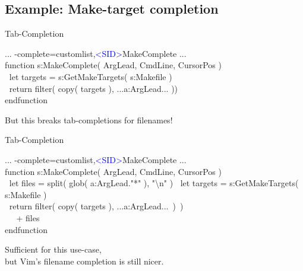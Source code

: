 \documentclass{beamer}
\newenvironment{mycode}[0]
{\ttfamily}
{}
\newcommand{\myind}[1]{\textcolor{white}{#1}}
\newcommand{\myident}[1]{\textcolor{identifier}{#1}}
\newcommand{\mykeywd}[1]{\textcolor{keyword}{#1}}
\newcommand{\mystring}[1]{\textcolor{string}{#1}}
\newcommand{\myctrlkey}[1]{\textcolor{blue}{#1}}
\begin{document}
\subsection{Example: Make-target completion}

\begin{frame}{Tab-Completion}{}

	\begin{mycode}
		... -complete=customlist,\myctrlkey{<SID>}MakeComplete ... \\[5mm]

		\mykeywd{function} s:MakeComplete( ArgLead, CmdLine, CursorPos ) \\
		\myind{..}\mykeywd{let} targets = s:GetMakeTargets( s:Makefile ) \\[2mm]

		\myind{..}\mykeywd{return} \myident{filter}( \myident{copy}( targets ), ...\myident{a:ArgLead}... )) \\
		\mykeywd{endfunction}
	\end{mycode}

	\vspace{5mm}
	\pause

	But this breaks tab-completions for filenames!

\end{frame}

\begin{frame}{Tab-Completion}{}

	\begin{mycode}
		... -complete=customlist,\myctrlkey{<SID>}MakeComplete ... \\[5mm]

		\mykeywd{function} s:MakeComplete( ArgLead, CmdLine, CursorPos ) \\
			\myind{..}\mykeywd{let} files {} {} = \myident{split}( \myident{glob}( \myident{a:ArgLead}.\mystring{"*"} ), \mystring{"\textbackslash{}n"} )
			\myind{..}\mykeywd{let} targets = s:GetMakeTargets( s:Makefile ) \\[2mm]

			\myind{..}\mykeywd{return} \myident{filter}( \myident{copy}( targets ), ...\myident{a:ArgLead}...\ )\ ) \\
			\myind{.....}+ files \\
		\mykeywd{endfunction}
	\end{mycode}

	\vspace{5mm}
	\pause

	Sufficient for this use-case, \\
	but Vim's filename completion is still nicer.

\end{frame}
\end{document}
